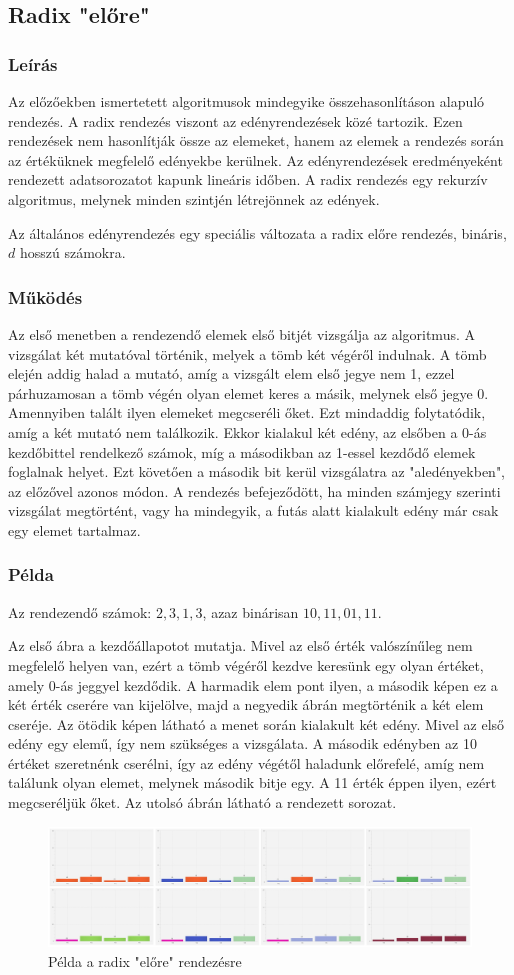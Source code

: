 \documentclass{elteikthesis}
\newcommand{\hiddensubsubsection}[1]{
	\stepcounter{subsubsection}
	\subsubsection*{{#1}}	
}
\begin{document}
\subsection{Radix "előre"}
\hiddensubsubsection{Leírás}
Az előzőekben ismertetett algoritmusok mindegyike összehasonlításon alapuló rendezés. A radix rendezés viszont az edényrendezések közé tartozik. Ezen rendezések nem hasonlítják össze az elemeket, hanem az elemek a rendezés során az értéküknek megfelelő edényekbe kerülnek. Az edényrendezések eredményeként rendezett adatsorozatot kapunk lineáris időben\cite{Ronyai}. 
A radix rendezés egy rekurzív algoritmus, melynek minden szintjén létrejönnek az edények.\par
Az általános edényrendezés egy speciális változata a radix előre rendezés, bináris, $d$ hosszú számokra.\par
\hiddensubsubsection{Működés}
Az első menetben a rendezendő elemek első bitjét vizsgálja az algoritmus. A vizsgálat két mutatóval történik, melyek a tömb két végéről indulnak. A tömb elején addig halad a mutató, amíg a vizsgált elem első jegye nem 1, ezzel párhuzamosan a tömb végén olyan elemet keres a másik, melynek első jegye 0. Amennyiben talált ilyen elemeket megcseréli őket. Ezt mindaddig folytatódik, amíg a két mutató nem találkozik. Ekkor kialakul két edény, az elsőben a 0-ás kezdőbittel rendelkező számok, míg a másodikban az 1-essel kezdődő elemek foglalnak helyet. Ezt követően a második bit kerül vizsgálatra az "aledényekben", az előzővel azonos módon. A rendezés befejeződött, ha minden számjegy szerinti vizsgálat megtörtént, vagy ha mindegyik, a futás alatt kialakult edény már csak egy elemet tartalmaz.
 \hiddensubsubsection{Példa}
 Az rendezendő számok: $2, 3, 1, 3$, azaz binárisan $10, 11, 01, 11$.\par
 Az első ábra a kezdőállapotot mutatja. Mivel az első érték valószínűleg nem megfelelő helyen van, ezért a tömb végéről kezdve keresünk egy olyan értéket, amely 0-ás jeggyel kezdődik. A harmadik elem pont ilyen, a második képen ez a két érték cserére van kijelölve, majd a negyedik ábrán megtörténik a két elem cseréje. Az ötödik képen látható a menet során kialakult két edény. Mivel az első edény egy elemű, így nem szükséges a vizsgálata. A második edényben az 10 értéket szeretnénk cserélni, így az edény végétől haladunk előrefelé, amíg nem találunk olyan elemet, melynek második bitje egy. A 11 érték éppen ilyen, ezért megcseréljük őket. Az utolsó ábrán látható a rendezett sorozat.\par
 \begin{figure}[H]
 	\centering
 	\includegraphics[width=1\textwidth]{pics/radixforward.jpg}
 	\caption{Példa a radix "előre" rendezésre}
 \end{figure}\par
\end{document}
